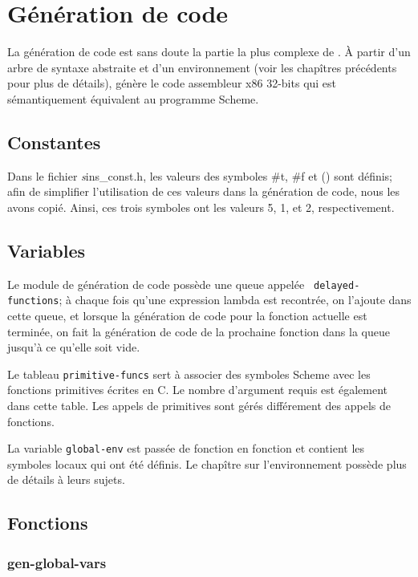 \documentclass[11pt]{report}
\begin{document}
\chapter{Génération de code}

La génération de code est sans doute la partie la plus complexe de
\sins{}.  À partir d'un arbre de syntaxe abstraite et d'un
environnement (voir les chapîtres précédents pour plus de détails),
\sins{} génère le code assembleur x86 32-bits qui est sémantiquement
équivalent au programme Scheme.

\section{Constantes}

Dans le fichier {\emph sins_const.h}, les valeurs des symboles \#t,
\#f et () sont définis; afin de simplifier l'utilisation de ces
valeurs dans la génération de code, nous les avons copié.  Ainsi, ces
trois symboles ont les valeurs 5, 1, et 2, respectivement.

\section{Variables}

Le module de génération de code possède une queue appelée {\tt
  delayed-functions}; à chaque fois qu'une expression lambda est
recontrée, on l'ajoute dans cette queue, et lorsque la génération de
code pour la fonction actuelle est terminée, on fait la génération de
code de la prochaine fonction dans la queue jusqu'à ce qu'elle soit
vide.

Le tableau {\tt primitive-funcs} sert à associer des symboles Scheme
avec les fonctions primitives écrites en C.  Le nombre d'argument
requis est également dans cette table.  Les appels de primitives sont
gérés différement des appels de fonctions.

La variable {\tt global-env} est passée de fonction en fonction et
contient les symboles locaux qui ont été définis.  Le chapître sur
l'environnement possède plus de détails à leurs sujets.



\section{Fonctions}

\subsection{gen-global-vars}
\end{document}
